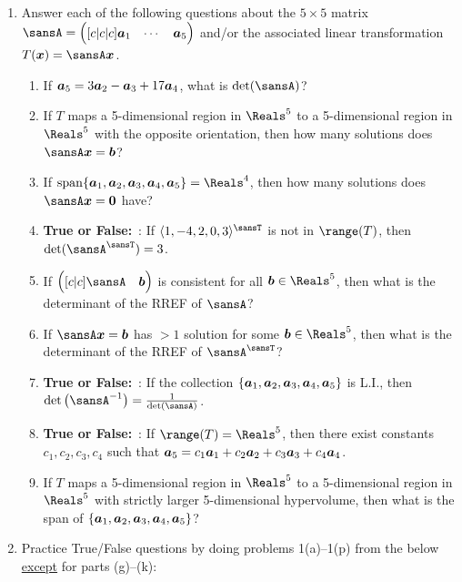 \documentclass[12pt]{article}
\theoremstyle{definition}
\theoremstyle{underl}
\newcommand{\TF}{\textbf{True or False:}~}
\newcommand{\pmatgrid}[2]{\renewcommand{\arraystretch}{1.25}\begin{pmatrix}[#1] #2\end{pmatrix}}
\begin{document}
\begin{enumerate}[topsep=0.125in, itemsep=0.625in]
\begin{enumerate}[itemsep=0.25in]
			\ul{or} state that no solution exists.
		\end{enumerate}
	
		\item Answer each of the following questions about the $5\times 5$ matrix $\sansA=\pmatgrid{c|c|c}{\vect{a}_1 & \cdots & \vect{a}_5}$ and/or the associated linear transformation $T(\vect{x})=\sansA\vect{x}$.
		\begin{enumerate}[itemsep=0.25in]
			\item If $\boldsymbol{a}_5=3\boldsymbol{a}_2-\boldsymbol{a}_3+17\boldsymbol{a}_4$, what is $\det(\sansA)$?
			\item If $T$ maps a 5-dimensional region in $\Reals^5$ to a 5-dimensional region in $\Reals^5$ with the opposite orientation, then how many solutions does $\sansA\vect{x}=\vect{b}$?
			\item If $\vsspan\{\vect{a}_1,\vect{a}_2,\vect{a}_3,\vect{a}_4,\vect{a}_5\}=\Reals^4$, then how many solutions does $\sansA\vect{x}=\vect{0}$ have?
			\item \TF: If $\langle 1,-4,2,0,3\rangle^\sansT$ is not in $\range(T)$, then $\det(\sansA^\sansT)=3$.
			\item If $\pmatgrid{c|c}{\sansA & \vect{b}}$ is consistent for all $\vect{b}\in\Reals^5$, then what is the determinant of the RREF of $\sansA$?
			\item If $\sansA\vect{x}=\vect{b}$ has $> 1$ solution for some $\vect{b}\in\Reals^5$, then what is the determinant of the RREF of $\sansA^\sansT$?
			\item \TF: If the collection $\{\boldsymbol{a}_1,\boldsymbol{a}_2,\boldsymbol{a}_3,\boldsymbol{a}_4,\boldsymbol{a}_5\}$ is L.I., then $\det\left(\sansA^{-1}\right)=\frac{1}{\det(\sansA)}$.
			\item \TF: If $\range(T)=\Reals^5$, then there exist constants $c_1,c_2,c_3,c_4$ such that $\boldsymbol{a}_5=c_1\boldsymbol{a}_1+c_2\boldsymbol{a}_2+c_3\boldsymbol{a}_3+c_4\boldsymbol{a}_4$.
			\item If $T$ maps a 5-dimensional region in $\Reals^5$ to a 5-dimensional region in $\Reals^5$ with strictly larger 5-dimensional hypervolume, then what is the span of $\{\boldsymbol{a}_1,\boldsymbol{a}_2,\boldsymbol{a}_3,\boldsymbol{a}_4,\boldsymbol{a}_5\}$?
		\end{enumerate}
		
		\item Practice True/False questions by doing problems 1(a)--1(p) from the below \ul{except} for parts \mbox{(g)--(k)}:
		

\end{enumerate}
\end{document}
